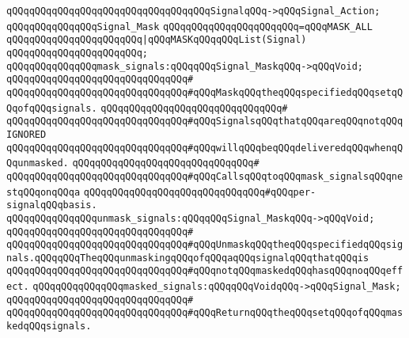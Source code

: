 \verb|qQQqqQQqqQQqqQQqqQQqqQQqqQQqqQQqqQQqSignalqQQq->qQQqSignal_Action;|\newline
\newline
\verb|qQQqqQQqqQQqqQQqSignal_Mask|\newline
\verb|qQQqqQQqqQQqqQQqqQQqqQQq=qQQqMASK_ALL|\newline
\verb|qQQqqQQqqQQqqQQqqQQqqQQq|\verb#|qQQqMASKqQQqqQQqList(Signal)#\newline
\verb|qQQqqQQqqQQqqQQqqQQqqQQq;|\newline
\newline
\verb|qQQqqQQqqQQqqQQqmask_signals:qQQqqQQqSignal_MaskqQQq->qQQqVoid;|\newline
\verb|qQQqqQQqqQQqqQQqqQQqqQQqqQQqqQQq#|\newline
\verb|qQQqqQQqqQQqqQQqqQQqqQQqqQQqqQQq#qQQqMaskqQQqtheqQQqspecifiedqQQqsetqQQqofqQQqsignals.|\newline
\verb|qQQqqQQqqQQqqQQqqQQqqQQqqQQqqQQq#|\newline
\verb|qQQqqQQqqQQqqQQqqQQqqQQqqQQqqQQq#qQQqSignalsqQQqthatqQQqareqQQqnotqQQqIGNORED|\newline
\verb|qQQqqQQqqQQqqQQqqQQqqQQqqQQqqQQq#qQQqwillqQQqbeqQQqdeliveredqQQqwhenqQQqunmasked.|\newline
\verb|qQQqqQQqqQQqqQQqqQQqqQQqqQQqqQQq#|\newline
\verb|qQQqqQQqqQQqqQQqqQQqqQQqqQQqqQQq#qQQqCallsqQQqtoqQQqmask_signalsqQQqnestqQQqonqQQqa|\newline
\verb|qQQqqQQqqQQqqQQqqQQqqQQqqQQqqQQq#qQQqper-signalqQQqbasis.|\newline
\newline
\verb|qQQqqQQqqQQqqQQqunmask_signals:qQQqqQQqSignal_MaskqQQq->qQQqVoid;|\newline
\verb|qQQqqQQqqQQqqQQqqQQqqQQqqQQqqQQq#|\newline
\verb|qQQqqQQqqQQqqQQqqQQqqQQqqQQqqQQq#qQQqUnmaskqQQqtheqQQqspecifiedqQQqsignals.qQQqqQQqTheqQQqunmaskingqQQqofqQQqaqQQqsignalqQQqthatqQQqis|\newline
\verb|qQQqqQQqqQQqqQQqqQQqqQQqqQQqqQQq#qQQqnotqQQqmaskedqQQqhasqQQqnoqQQqeffect.|\newline
\newline
\verb|qQQqqQQqqQQqqQQqmasked_signals:qQQqqQQqVoidqQQq->qQQqSignal_Mask;|\newline
\verb|qQQqqQQqqQQqqQQqqQQqqQQqqQQqqQQq#|\newline
\verb|qQQqqQQqqQQqqQQqqQQqqQQqqQQqqQQq#qQQqReturnqQQqtheqQQqsetqQQqofqQQqmaskedqQQqsignals.|\newline
